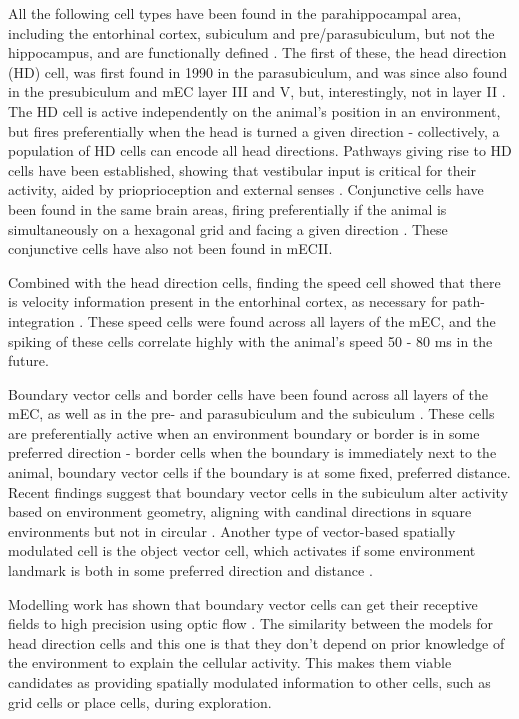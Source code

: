 \documentclass{article}
\begin{document}
    All the following cell types have been found in the parahippocampal area, including the entorhinal cortex, subiculum and pre/parasubiculum, but not the hippocampus, and are functionally defined \parencite{Brandon2014}. The first of these, the head direction (HD) cell, was first found in 1990 in the parasubiculum, and was since also found in the presubiculum and mEC layer III and V, but, interestingly, not in layer II \parencite{Taube1990}. The HD cell is active independently on the animal's position in an environment, but fires preferentially when the head is turned a given direction - collectively, a population of HD cells can encode all head directions. Pathways giving rise to HD cells have been established, showing that vestibular input is critical for their activity, aided by prioprioception and external senses \parencite{Taube2007}. Conjunctive cells have been found in the same brain areas, firing preferentially if the animal is simultaneously on a hexagonal grid and facing a given direction \parencite{Sargolini2006}. These conjunctive cells have also not been found in mECII.

    Combined with the head direction cells, finding the speed cell showed that there is velocity information present in the entorhinal cortex, as necessary for path-integration \parencite{Kropff2015}. These speed cells were found across all layers of the mEC, and the spiking of these cells correlate highly with the animal's speed 50 - 80 ms in the future.

    Boundary vector cells and border cells have been found across all layers of the mEC, as well as in the pre- and parasubiculum and the subiculum \parencite{Solstad2008,Boccara2010, Lever2009}. These cells are preferentially active when an environment boundary or border is in some preferred direction - border cells when the boundary is immediately next to the animal, boundary vector cells if the boundary is at some fixed, preferred distance. Recent findings suggest that boundary vector cells in the subiculum alter activity based on environment geometry, aligning with candinal directions in square environments but not in circular \parencite{Muessig2024}. Another type of vector-based spatially modulated cell is the object vector cell, which activates if some environment landmark is both in some preferred direction and distance \parencite{Høydal2019}.

    Modelling work has shown that boundary vector cells can get their receptive fields to high precision using optic flow \parencite{Raudies2012}. The similarity between the models for head direction cells and this one is that they don't depend on prior knowledge of the environment to explain the cellular activity. This makes them viable candidates as providing spatially modulated information to other cells, such as grid cells or place cells, during exploration.
\end{document}
